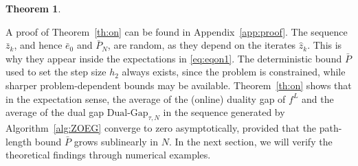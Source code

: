 \documentclass{article}
\theoremstyle{plain}
\newtheorem{theorem}{Theorem}[section]
\theoremstyle{definition}
\theoremstyle{remark}
\begin{document}
\begin{theorem}
\end{theorem}
A proof of Theorem~\ref{th:on} can be found in Appendix~\ref{app:proof}.
The sequence $\bar{z}_k$, and hence $\bar{e}_0$ and $\bar{P}_N$, are random, as they depend on the iterates $\hat{z}_k$. This is why they appear inside the expectations in \eqref{eq:eqon1}. The deterministic bound $\bar{P}$ used to set the step size $h_2$ always exists, since the problem is constrained, while sharper problem-dependent bounds may be available.
Theorem~\ref{th:on} shows that in the expectation sense, the average of the (online) duality gap of $f^L$ and the average of the dual gap $\text{Dual-Gap}_{\tau,N}$ in the sequence generated by Algorithm~\ref{alg:ZOEG} converge to zero asymptotically, provided that the path-length bound $\bar{P}$ grows sublinearly in $N$.
In the next section, we will verify the theoretical findings through numerical examples.
\end{document}
